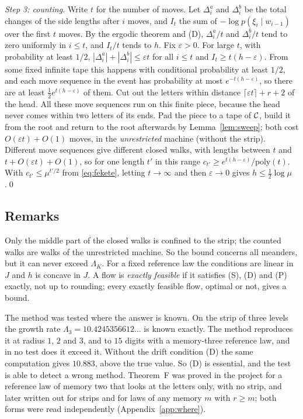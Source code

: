 \emph{Step 3: counting.} Write $t$ for the number of moves. Let $\Delta^a_i$ and $\Delta^b_i$ be the total changes
of the side lengths after $i$ moves, and $I_t$ the sum of $-\log p(\xi_i\mid w_{i-1})$ over the first $t$ moves. By the
ergodic theorem and (D), $\Delta^a_i/t$ and $\Delta^b_i/t$ tend to zero uniformly in $i\le t$, and $I_t/t$ tends to
$h$. Fix $\varepsilon>0$. For large $t$, with probability at least $1/2$, $|\Delta^a_i|+|\Delta^b_i|\le\varepsilon t$
for all $i\le t$ and $I_t\ge t(h-\varepsilon)$. From some fixed infinite tape this happens with conditional
probability at least $1/2$, and each move sequence in the event has probability at most $e^{-t(h-\varepsilon)}$, so
there are at least $\frac12e^{t(h-\varepsilon)}$ of them. Cut out the letters within distance
$\lceil\varepsilon t\rceil+r+2$ of the head. All these move sequences run on this finite piece, because the head never
comes within two letters of its ends. Pad the piece to a tape of $\mathcal{C}$, build it from the root and return to the root
afterwards by Lemma~\ref{lem:sweep}; both cost $O(\varepsilon t)+O(1)$ moves, in the \emph{unrestricted} machine
(without the strip). Different move sequences give different closed walks, with lengths between $t$ and
$t+O(\varepsilon t)+O(1)$, so for one length $t'$ in this range $c_{t'}\ge e^{t(h-\varepsilon)}/\mathrm{poly}(t)$. With
$c_{t'}\le\mu^{t'/2}$ from \eqref{eq:fekete}, letting $t\to\infty$ and then $\varepsilon\to0$ gives
$h\le\frac12\log\mu$.\qed

\subsection{Remarks}

Only the middle part of the closed walks is confined to the strip; the counted walks are walks of the unrestricted
machine. So the bound concerns all meanders, but it can never exceed $\Lambda_K$. For a fixed reference law the
conditions are linear in $J$ and $h$ is concave in $J$. A flow is \emph{exactly feasible} if it satisfies (S), (D)
and (P) exactly, not up to rounding; every exactly feasible flow, optimal or not, gives a bound.

The method was tested where the answer is known. On the strip of three levels the growth rate
$\Lambda_3=10.4245356612\ldots$ is known exactly. The method reproduces it at radius $1$, $2$ and $3$, and to
$15$ digits with a memory-three reference law, and in no test does it exceed it. Without the drift condition
(D) the same computation gives $10.883$, above the true value. So (D) is essential, and the test is able to detect a
wrong method. Theorem~F was proved in the project for a reference law of memory two that looks at the letters only,
with no strip, and later written out for strips and for laws of any memory $m$ with $r\ge m$; both forms were read
independently (Appendix~\ref{app:where}).
